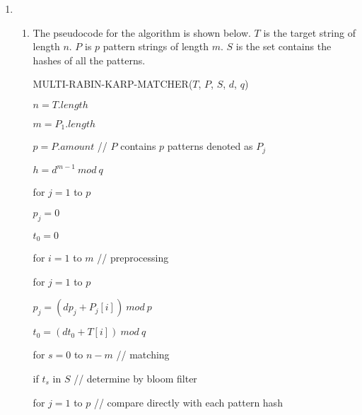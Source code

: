 \documentclass[11pt,letterpaper,oneside]{article}
\begin{document}
\begin{enumerate}
\begin{enumerate}
\end{enumerate}

\item 
\begin{enumerate}
\item The pseudocode for the algorithm is shown below. $T$ is the target string of length $n$. $P$ is $p$ pattern strings of length $m$. $S$ is the set contains the hashes of all the patterns.

\vspace{1em}\hspace{2em} MULTI-RABIN-KARP-MATCHER($T$, $P$, $S$, $d$, $q$)

\hspace{3em}    $n = T.length$

\hspace{3em}    $m = P_1.length$

\hspace{3em}    $p = P.amount$   \hspace{4em}// $P$ contains $p$ patterns denoted as $P_j$

\hspace{3em}    $h = d^{m-1}\ mod\ q$

\hspace{3em}    for $j = 1$ to $p$
 
\hspace{4em}        $p_j = 0$

\hspace{3em}    $t_0 = 0$

\hspace{3em}    for $i = 1$ to $m$   \hspace{4em}// preprocessing
 
\hspace{4em}        for $j = 1$ to $p$
 
\hspace{5em}            $p_j = (dp_j + P_j[i])\ mod\ p$

\hspace{4em}        $t_0 = (dt_0 + T[i])\ mod\ q$

\hspace{3em}    for $s = 0$ to $n-m$    \hspace{4em}// matching
 
\hspace{4em}        if $t_s$ in $S$    \hspace{4em}// determine by bloom filter

\hspace{5em}            for $j = 1$ to $p$    \hspace{4em}// compare directly with each pattern hash
 

\end{enumerate}
\end{enumerate}
\end{document}
